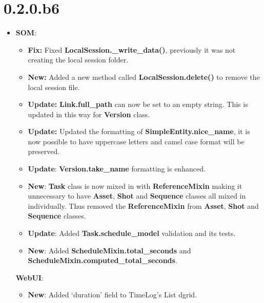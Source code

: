 \documentclass[a4paper,10pt,english]{sphinxmanual}
\begin{document}
\section{0.2.0.b6}
\label{changelog:b6}\begin{itemize}
\item {} 
\textbf{SOM}:
\begin{itemize}
\item {} 
\textbf{Fix:} Fixed \textbf{LocalSession.\_write\_data()}, previously it was not
creating the local session folder.

\item {} 
\textbf{New:} Added a new method called \textbf{LocalSession.delete()} to remove the
local session file.

\item {} 
\textbf{Update:} \textbf{Link.full\_path} can now be set to an empty string. This is
updated in this way for \textbf{Version} class.

\item {} 
\textbf{Update:} Updated the formatting of \textbf{SimpleEntity.nice\_name}, it is now
possible to have uppercase letters and camel case format will be preserved.

\item {} 
\textbf{Update}: \textbf{Version.take\_name} formatting is enhanced.

\item {} 
\textbf{New}: \textbf{Task} class is now mixed in with \textbf{ReferenceMixin} making it
unnecessary to have \textbf{Asset}, \textbf{Shot} and \textbf{Sequence} classes all mixed
in individually. Thus removed the \textbf{ReferenceMixin} from \textbf{Asset},
\textbf{Shot} and \textbf{Sequence} classes.

\item {} 
\textbf{Update}: Added \textbf{Task.schedule\_model} validation and its tests.

\item {} 
\textbf{New}: Added \textbf{ScheduleMixin.total\_seconds} and
\textbf{ScheduleMixin.computed\_total\_seconds}.

\end{itemize}

\textbf{WebUI}:
\begin{itemize}
\item {} 
\textbf{New}: Added `duration' field to TimeLog's List dgrid.

\end{itemize}

\end{itemize}
\end{document}

